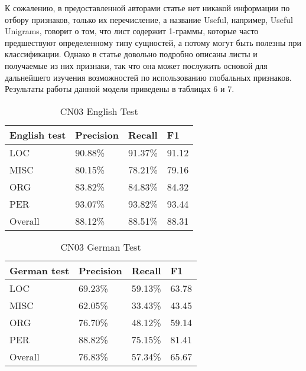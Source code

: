 К сожалению, в предоставленной авторами статье нет никакой информации по отбору признаков, только их перечисление, а название Useful, например, Useful Unigrams, говорит о том, что лист содержит 1-граммы, которые часто предшествуют определенному типу сущностей, а потому могут быть полезны при классификации. Однако в статье довольно подробно описаны листы и получаемые из них признаки, так что она может послужить основой для дальнейшего изучения возможностей по использованию глобальных признаков. Результаты работы данной модели приведены в таблицах 6 и 7.

\begin{table}[ht]
\centering
\caption{CN03 English Test}
\label{2place_eng}
\begin{tabular}{|l|l|l|l|}
\hline
\textbf{English test} & \textbf{Precision} & \textbf{Recall} & \textbf{F1} \\ \hline
LOC                   & 90.88\%            & 91.37\%         & 91.12       \\ \hline
MISC                  & 80.15\%            & 78.21\%         & 79.16       \\ \hline
ORG                   & 83.82\%            & 84.83\%         & 84.32       \\ \hline
PER                   & 93.07\%            & 93.82\%         & 93.44       \\ \hline
Overall               & 88.12\%            & 88.51\%         & 88.31       \\ \hline
\end{tabular}
\end{table}

\begin{table}[ht]
\centering
\caption{CN03 German Test}
\label{2place_ger}
\begin{tabular}{|l|l|l|l|}
\hline
\textbf{German test} & \textbf{Precision} & \textbf{Recall} & \textbf{F1} \\ \hline
LOC                  & 69.23\%            & 59.13\%         & 63.78       \\ \hline
MISC                 & 62.05\%            & 33.43\%         & 43.45       \\ \hline
ORG                  & 76.70\%            & 48.12\%         & 59.14       \\ \hline
PER                  & 88.82\%            & 75.15\%         & 81.41       \\ \hline
Overall              & 76.83\%            & 57.34\%         & 65.67       \\ \hline
\end{tabular}
\end{table}


